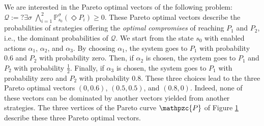\begin{example}
\begin{figure}[h]
    \label{pareto-curve-example}
  \end{figure}
We are interested in the Pareto optimal vectors of the following \MOSR{} problem:
$\mathcal{Q}:= ?\exists \sigma \; \bigwedge_{i=1}^2 \mathbb{P}^\sigma_{s_0}(\Diamond P_i) \geq 0$.
These Pareto optimal vectors describe the probabilities of strategies offering the \textit{optimal compromises} of reaching $P_1$ and $P_2$, i.e., the dominant probabilities of $\mathcal{Q}$.
We start from the state $s_0$ with enabled actions $\alpha_1$, $\alpha_2$, and $\alpha_3$.
By choosing $\alpha_1$, the system goes to $P_1$ with probability $0.6$ and $P_2$ with probability zero.
Then, if $\alpha_2$ is chosen, the system goes to $P_1$ and $P_2$ with probability $\frac{1}{2}$.
Finally, if $\alpha_3$ is chosen, the system goes to $P_1$ with probability zero and $P_2$ with probability $0.8$.
These three choices lead to the three Pareto optimal  vectors
$(0, 0.6)$, $(0.5, 0.5)$, and $(0.8, 0)$.
Indeed, none of these vectors can be dominated by
another vectors yielded from another strategies.
The three vertices of the Pareto curve $\mathpzc{P}$ of Figure \ref{pareto-curve-example} describe these three Pareto optimal vectors.
\end{example}


